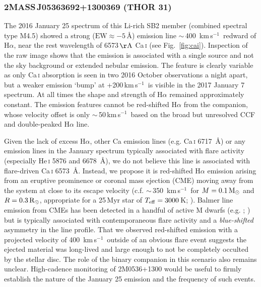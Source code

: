 \documentclass[usenatbib]{mnras}
\newcommand{\kms}{\textrm{km\,s$^{-1}$}}
\begin{document}
\subsubsection{2MASS\,J05363692+1300369 (THOR 31)}

The 2016 January 25 spectrum of this Li-rich SB2 member (combined
spectral type M4.5) showed a strong ($\textrm{EW}\approx-5$\,\AA)
emission line $\sim$\,400~\kms\ redward of H$\alpha$, near the rest wavelength of 6573\,$\rm{\AA}$ Ca\,\textsc{i} (see Fig.~\ref{fig:cai}). Inspection of the raw image shows that the emission is associated with a single source and not the sky background or
extended nebular emission. The feature 
is clearly variable as only Ca\,\textsc{i} absorption is seen in two 2016 October observations a night apart, but a weaker emission `bump' at +200\,\kms\ is visible in the 2017 January 7 spectrum. At all times the shape and strength of H$\alpha$ remained approximately constant.  The emission features cannot be red-shifted H$\alpha$ from the companion, whose velocity offset is only $\sim$\,50\,\kms\ based on the broad but unresolved CCF and double-peaked H$\alpha$ line.

Given the lack of excess H$\alpha$, other Ca emission lines (e.g. Ca\,\textsc{i} 6717~\AA) or any emission lines in the January spectrum typically associated with flare activity (especially He\,\textsc{i} 5876 and 6678~\AA), we do not believe this line is associated with flare-driven Ca\,\textsc{i} 6573~\AA. Instead, we propose it is red-shifted H$\alpha$ emission arising from an eruptive prominence or coronal mass ejection (CME) moving away from the system at close to its escape velocity (c.f. $\sim$\,350~\kms\ for $M=0.1\,\rm{M_{\odot}}$ and $R=0.3\,\rm{R_{\odot}}$, appropriate for a 25\,Myr star of $T_{\rm eff}=3000$\,K; \citealp{Baraffe15}).  Balmer line emission from CMEs has been detected in a handful of active M dwarfs (e.g. \citealp*{Houdebine90}; \citealp{Guenther97,Fuhrmeister04}) but is typically  associated with contemporaneous flare activity and a \emph{blue-shifted} asymmetry in the line profile.  That we observed red-shifted emission with a projected velocity of 400~\kms\ outside of an obvious flare event suggests the ejected material was long-lived and large enough to not be completely occulted by the stellar disc. The role of the binary companion in this scenario also remains unclear. High-cadence monitoring of 2M0536+1300 would be useful to firmly establish the nature of the January 25 emission and the frequency of such events. 
\end{document}
